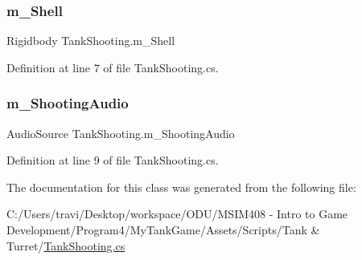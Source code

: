 \subsubsection{\texorpdfstring{m\+\_\+\+Shell}{m\_Shell}}
{\footnotesize\ttfamily Rigidbody Tank\+Shooting.\+m\+\_\+\+Shell}



Definition at line 7 of file Tank\+Shooting.\+cs.

\mbox{\label{class_tank_shooting_a7d8d764d8c953938735573157284ac6a}} 
\subsubsection{\texorpdfstring{m\+\_\+\+Shooting\+Audio}{m\_ShootingAudio}}
{\footnotesize\ttfamily Audio\+Source Tank\+Shooting.\+m\+\_\+\+Shooting\+Audio}



Definition at line 9 of file Tank\+Shooting.\+cs.



The documentation for this class was generated from the following file\+:\begin{DoxyCompactItemize}
\item 
C\+:/\+Users/travi/\+Desktop/workspace/\+O\+D\+U/\+M\+S\+I\+M408 -\/ Intro to Game Development/\+Program4/\+My\+Tank\+Game/\+Assets/\+Scripts/\+Tank \& Turret/\hyperlink{_tank_shooting_8cs}{Tank\+Shooting.\+cs}\end{DoxyCompactItemize}
